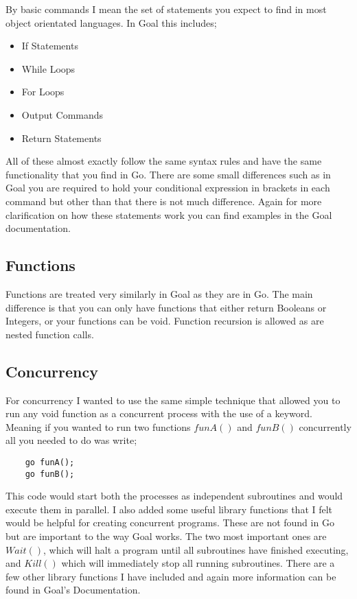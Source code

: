By basic commands I mean the set of statements you expect to find in most object orientated languages. In Goal this includes;

\begin{itemize}
	\item If Statements
	\item While Loops
	\item For Loops
	\item Output Commands
	\item Return Statements 
\end{itemize}

All of these almost exactly follow the same syntax rules and have the same functionality that you find in Go. There are some small differences such as in Goal you are required to hold your conditional expression in brackets in each command but other than that there is not much difference. Again for more clarification on how these statements work you can find examples in the Goal documentation.

\subsection{Functions}

Functions are treated very similarly in Goal as they are in Go. The main difference is that you can only have functions that either return Booleans or Integers, or your functions can be void. Function recursion is allowed as are nested function calls.

\subsection{Concurrency}
\label{sec:concDes}

For concurrency I wanted to use the same simple technique that allowed you to run any void function as a concurrent process with the use of a keyword. Meaning if you wanted to run two functions $funA()$ and $funB()$ concurrently all you needed to do was write;

\begin{lstlisting}
	go funA();
	go funB();	
\end{lstlisting}
This code would start both the processes as independent subroutines and would execute them in parallel. I also added some useful library functions that I felt would be helpful for creating concurrent programs. These are not found in Go but are important to the way Goal works. The two most important ones are $Wait()$, which will halt a program until all subroutines have finished executing, and $Kill()$ which will immediately stop all running subroutines. There are a few other library functions I have included and again more information can be found in Goal's Documentation.  

